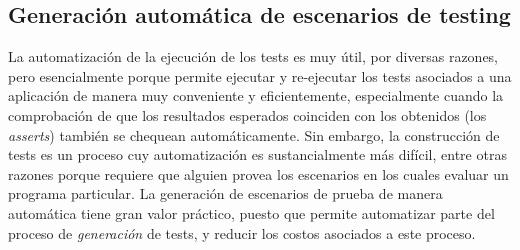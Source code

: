 \subsection{Generaci\'on autom\'atica de escenarios de testing}

La automatizaci\'on de la ejecuci\'on de los tests es muy \'util, por diversas razones, pero esencialmente porque permite ejecutar y re-ejecutar los tests asociados a una aplicaci\'on de manera muy conveniente y eficientemente, especialmente cuando la comprobaci\'on de que los resultados esperados coinciden con los obtenidos (los \emph{asserts}) tambi\'en se chequean autom\'aticamente. Sin embargo, la construcci\'on de tests es un proceso cuy automatizaci\'on es sustancialmente m\'as dif\'icil, entre otras razones porque requiere que alguien provea los escenarios en los cuales evaluar un programa particular. La generaci\'on de escenarios de prueba de manera autom\'atica tiene gran valor pr\'actico, puesto que permite automatizar parte del proceso de \emph{generaci\'on} de tests, y reducir los costos asociados a este proceso. 

